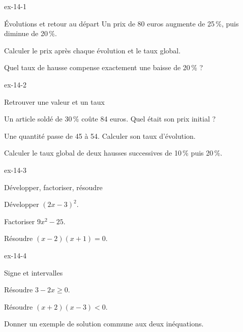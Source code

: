 \begin{blocLivre}{ex-14-1}
\begin{exercice}[1]{Évolutions et retour au départ}
Un prix de 80 euros augmente de 25\,\%, puis diminue de 20\,\%.\begin{questions}
\item Calculer le prix après chaque évolution et le taux global.
\item Quel taux de hausse compense exactement une baisse de 20\,\% ?
\end{questions}
\end{exercice}
\end{blocLivre}
\begin{blocLivre}{ex-14-2}
\begin{exercice}[1]{Retrouver une valeur et un taux}
\begin{questions}
\item Un article soldé de 30\,\% coûte 84 euros. Quel était son prix initial ?
\item Une quantité passe de 45 à 54. Calculer son taux d’évolution.
\item Calculer le taux global de deux hausses successives de 10\,\% puis 20\,\%.
\end{questions}
\end{exercice}
\end{blocLivre}
\begin{blocLivre}{ex-14-3}
\begin{exercice}[1]{Développer, factoriser, résoudre}
\begin{questions}
\item Développer $(2x-3)^2$.
\item Factoriser $9x^2-25$.
\item Résoudre $(x-2)(x+1)=0$.
\end{questions}
\end{exercice}
\end{blocLivre}
\begin{blocLivre}{ex-14-4}
\begin{exercice}[1]{Signe et intervalles}
\begin{questions}
\item Résoudre $3-2x\geq0$.
\item Résoudre $(x+2)(x-3)<0$.
\item Donner un exemple de solution commune aux deux inéquations.
\end{questions}
\end{exercice}
\end{blocLivre}
